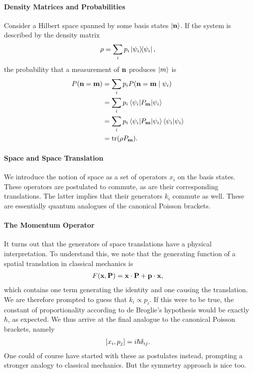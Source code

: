 \paragraph{Density Matrices and Probabilities}
Consider a Hilbert space spanned by some basis states $\ket{\vb{n}}$. If the system is described by the density matrix
\begin{align*}
	\rho = \sum\limits_{i}p_{i}\dyad{\psi_{i}},
\end{align*}
the probability that a measurement of $\vb{n}$ produces $\ket{m}$ is
\begin{align*}
	P(\vb{n} = \vb{m}) &= \sum\limits_{i}p_{i}P(\vb{n} = \vb{m}\mid\psi_{i}) \\
	                   &= \sum\limits_{i}p_{i}\expval{P_{\vb{m}}}{\psi_{i}} \\
	                   &= \sum\limits_{i}p_{i}\expval{P_{\vb{m}}}{\psi_{i}}\braket{\psi_{i}} \\
	                   &= \tr(\rho P_{\vb{m}}).
\end{align*}

\paragraph{Space and Space Translation}
We introduce the notion of space as a set of operators $x_{i}$ on the basis states. These operators are postulated to commute, as are their corresponding translations. The latter implies that their generators $k_{i}$ commute as well. These are essentially quantum analogues of the canonical Poisson brackets.

\paragraph{The Momentum Operator}
It turns out that the generators of space translations have a physical interpretation. To understand this, we note that the generating function of a spatial translation in classical mechanics is
\begin{align*}
	F(\vb{x}, \vb{P}) = \vb{x}\cdot\vb{P} + \vb{p}\cdot\vb{x},
\end{align*}
which contains one term generating the identity and one causing the translation. We are therefore prompted to guess that $k_{i} \propto p_{i}$. If this were to be true, the constant of proportionality according to de Broglie's hypothesis would be exactly $\hbar$, as expected. We thus arrive at the final analogue to the canonical Poisson brackets, namely
\begin{align*}
	\comm{x_{i}}{p_{j}} = i\hbar\delta_{ij}.
\end{align*}
One could of course have started with these as postulates instead, prompting a stronger analogy to classical mechanics. But the symmetry approach is nice too.

